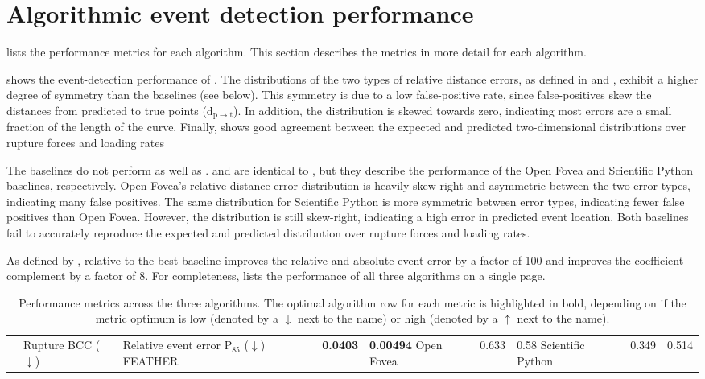 \section{Algorithmic event detection performance}

 lists the performance metrics for each algorithm. This section describes the metrics in more detail for each algorithm. 

 shows the event-detection performance of \name{}. The distributions of the two types of relative distance errors, as defined in  and , exhibit a higher degree of symmetry than the baselines (see below). This symmetry is due to a low false-positive rate, since false-positives skew the distances from predicted to true points (d$_{\mathrm{p}\rightarrow\mathrm{t}}$). In addition, the distribution is skewed towards zero, indicating most errors are a small fraction of the length of the curve. Finally,  shows good agreement between the expected and predicted two-dimensional distributions over rupture forces and loading rates 

The baselines do not perform as well as \name{}.  and  are identical to , but they describe the performance of the Open Fovea and Scientific Python baselines, respectively. Open Fovea's relative distance error distribution is heavily skew-right and asymmetric between the two error types, indicating many false positives. The same distribution for Scientific Python is more symmetric between error types, indicating fewer false positives than Open Fovea. However, the distribution is still skew-right, indicating a high error in predicted event location. Both baselines fail to accurately reproduce the expected and predicted distribution over rupture forces and loading rates.

As defined by , relative to the best baseline \name{} improves the relative and absolute event error by a factor of 100 and improves the \bc{} coefficient complement by a factor of 8. For completeness,  lists the performance of all three algorithms on a single page.

\begin{table}
\caption[Algorithm performance]{ Performance metrics across the three algorithms. The optimal algorithm row for each metric is highlighted in bold, depending on if the metric optimum is low (denoted by a $\downarrow$ next to the name) or high (denoted by a $\uparrow$ next to the name).} 
\begin{tabularx}{\textwidth}{ l || l | l }
\hline \hline
 & Rupture BCC ($\downarrow$) & Relative event error P$_{85}$ ($\downarrow$)\e\hline 
FEATHER & \textbf{0.0403} & \textbf{0.00494}\e
Open Fovea & 0.633 & 0.58\e
Scientific Python & 0.349 & 0.514\e
\end{tabularx}
\end{table}



